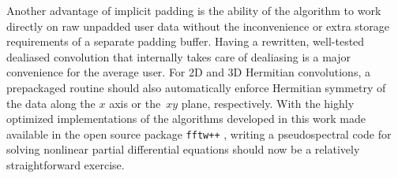 \documentclass[final]{siamltex}
\begin{document}
Another advantage of implicit padding is the ability of the algorithm to
work directly on raw unpadded user data without the inconvenience or extra
storage requirements of a separate padding buffer. 
Having a rewritten, well-tested dealiased convolution that internally
takes care of dealiasing is a major convenience for the average user.
For 2D and 3D Hermitian convolutions, a prepackaged routine should also
automatically enforce Hermitian symmetry of the data along the $x$ axis or
the~$xy$ plane, respectively. With the highly optimized implementations of
the algorithms developed in this work made available in the open source
package {\tt fftw++} \cite{fftwpp}, writing a pseudospectral code for
solving nonlinear partial differential equations should now be a relatively
straightforward exercise.



\end{document}
